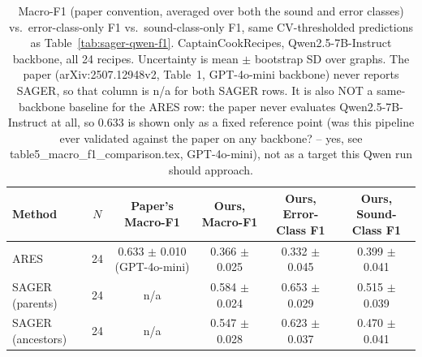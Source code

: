 \begin{table}[h]
\centering
\caption{Macro-F1 (paper convention, averaged over both the sound and error
  classes) vs.\ error-class-only F1 vs.\ sound-class-only F1, same
  CV-thresholded predictions as Table~\ref{tab:sager-qwen-f1}.
  CaptainCookRecipes, Qwen2.5-7B-Instruct backbone, all 24 recipes.
  Uncertainty is mean $\pm$ bootstrap SD over graphs.
  The paper (arXiv:2507.12948v2, Table~1, GPT-4o-mini backbone) never
  reports SAGER, so that column is n/a for both SAGER rows. It is also NOT a
  same-backbone baseline for the ARES row: the paper never evaluates
  Qwen2.5-7B-Instruct at all, so 0.633 is shown only as a fixed reference
  point (was this pipeline ever validated against the paper on any
  backbone? -- yes, see table5\_macro\_f1\_comparison.tex, GPT-4o-mini), not
  as a target this Qwen run should approach.}\label{tab:sager-qwen-macrof1}
\begin{tabular}{lccccc}
\toprule
Method & $N$ & Paper's Macro-F1 & Ours, Macro-F1 & Ours, Error-Class F1 & Ours, Sound-Class F1 \\
\midrule
ARES               & 24 & 0.633 $\pm$ 0.010 (GPT-4o-mini) & 0.366 $\pm$ 0.025 & 0.332 $\pm$ 0.045 & 0.399 $\pm$ 0.041 \\
SAGER (parents)     & 24 & n/a                             & 0.584 $\pm$ 0.024 & 0.653 $\pm$ 0.029 & 0.515 $\pm$ 0.039 \\
SAGER (ancestors)   & 24 & n/a                             & 0.547 $\pm$ 0.028 & 0.623 $\pm$ 0.037 & 0.470 $\pm$ 0.041 \\
\bottomrule
\end{tabular}
\end{table}

